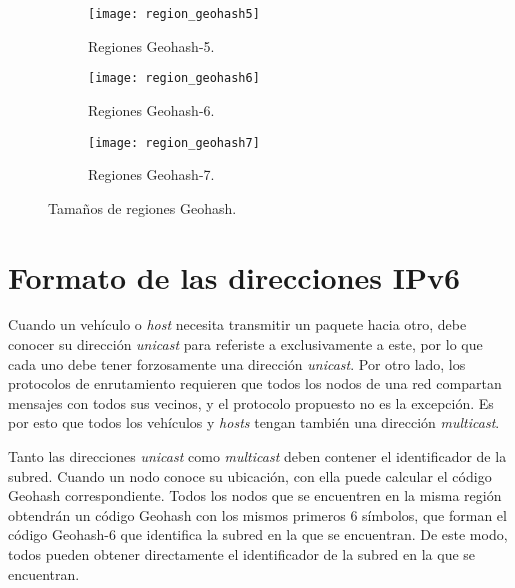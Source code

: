 \begin{figure}[th!]
\centering

\begin{subfigure}{\textwidth}
\centering
\texttt{[image: region\_geohash5]} 
\caption[Regiones Geohash-5]{Regiones Geohash-5.}
\label{fig:region_geohash5}
\end{subfigure}

\vspace{0.5cm}

\begin{subfigure}{\textwidth}
\centering
\texttt{[image: region\_geohash6]} 
\caption[Regiones Geohash-6]{Regiones Geohash-6.}
\label{fig:region_geohash6}
\end{subfigure}

\vspace{0.5cm}

\begin{subfigure}{\textwidth}
\centering
\texttt{[image: region\_geohash7]} 
\caption[Regiones Geohash-7]{Regiones Geohash-7.}
\label{fig:region_geohash7}
\end{subfigure}

\vspace{0.5cm}

\decoRule
\caption[Tamaños de regiones Geohash]{Tamaños de regiones Geohash.}
\label{fig:tamaños_geohash}

\end{figure}

\section{Formato de las direcciones IPv6}
\label{sec:formato_direcciones_ipv6}

Cuando un vehículo o \textit{host} necesita transmitir un paquete hacia otro,
debe conocer su dirección \textit{unicast} para referiste a exclusivamente a
este, por lo que cada uno debe tener forzosamente una dirección
\textit{unicast}. Por otro lado, los protocolos de enrutamiento requieren que
todos los nodos de una red compartan mensajes con todos sus vecinos, y el
protocolo propuesto no es la excepción. Es por esto que todos los vehículos y
\textit{hosts} tengan también una dirección \textit{multicast}.

Tanto las direcciones \textit{unicast} como \textit{multicast} deben contener el
identificador de la subred. Cuando un nodo conoce su ubicación, con ella puede
calcular el código Geohash correspondiente. Todos los nodos que se encuentren en
la misma región obtendrán un código Geohash con los mismos primeros 6 símbolos,
que forman el código Geohash-6 que identifica la subred en la que se
encuentran. De este modo, todos pueden obtener directamente el identificador de
la subred en la que se encuentran.

